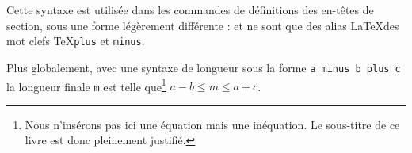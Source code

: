 \begin{latexcode}
\vspace{2.5cm minus 1.5cm plus 0.5cm}
\end{latexcode}

Cette syntaxe est utilisée dans les commandes de définitions des en-têtes de section, sous une forme légèrement différente :  et  ne sont que des alias \LaTeX des mot clefs \TeX \verb|plus| et \verb|minus|.

Plus globalement, avec une syntaxe de longueur sous la forme \verb|a minus b plus c| la longueur finale \verb|m| est telle que\footnote{Nous n'insérons pas ici une équation mais une inéquation. Le sous-titre de ce livre est donc pleinement justifié.} $ a - b \leq m \leq a + c $.  

